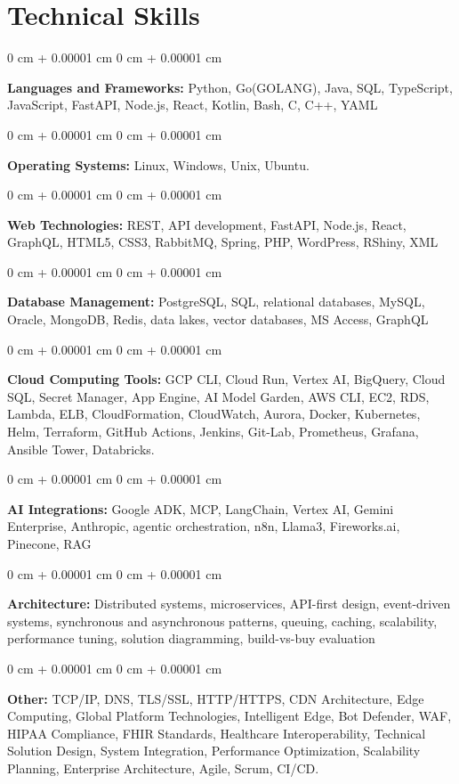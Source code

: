 \documentclass[10pt, letterpaper]{article}
\newenvironment{onecolentry}{
    \begin{adjustwidth}{
        0 cm + 0.00001 cm
    }{
        0 cm + 0.00001 cm
    }
}{
    \end{adjustwidth}
} %
\begin{document}
    \section{Technical Skills}
    \vspace{2 pt }
    \begin{onecolentry}
    \textbf{Languages and Frameworks:} Python, Go(GOLANG), Java, SQL, TypeScript, JavaScript, FastAPI, Node.js, React, Kotlin, Bash, C, C++, YAML
    \end{onecolentry}
    \begin{onecolentry}
        \textbf{Operating Systems:} Linux, Windows, Unix, Ubuntu.
    \end{onecolentry}
    \begin{onecolentry}
         \textbf{Web Technologies:} REST, API development, FastAPI, Node.js, React, GraphQL, HTML5, CSS3, RabbitMQ, Spring, PHP, WordPress, RShiny, XML \end{onecolentry}
    \begin{onecolentry}
        \textbf{Database Management:} PostgreSQL, SQL, relational databases, MySQL, Oracle, MongoDB, Redis, data lakes, vector databases, MS Access, GraphQL \end{onecolentry}
    \begin{onecolentry}
        \textbf{Cloud Computing Tools:}
GCP CLI, Cloud Run, Vertex AI, BigQuery, Cloud SQL, Secret Manager, App Engine, AI Model Garden, AWS CLI, EC2, RDS, Lambda, ELB, CloudFormation, CloudWatch, Aurora, Docker, Kubernetes, Helm, Terraform, GitHub Actions, Jenkins, Git-Lab, Prometheus, Grafana, Ansible Tower, Databricks.
    \end{onecolentry}
    \begin{onecolentry}
         \textbf{AI Integrations:} Google ADK, MCP, LangChain, Vertex AI, Gemini Enterprise, Anthropic, agentic orchestration, n8n, Llama3, Fireworks.ai, Pinecone, RAG \end{onecolentry}
    \begin{onecolentry}
        \textbf{Architecture:} Distributed systems, microservices, API-first design, event-driven systems, synchronous and asynchronous patterns, queuing, caching, scalability, performance tuning, solution diagramming, build-vs-buy evaluation \end{onecolentry}
        \begin{onecolentry}
     \textbf{Other:} TCP/IP, DNS, TLS/SSL, HTTP/HTTPS, CDN Architecture, Edge Computing, Global Platform Technologies, Intelligent Edge, Bot Defender, WAF, HIPAA Compliance, FHIR Standards, Healthcare Interoperability, Technical Solution Design, System Integration, Performance Optimization, Scalability Planning, Enterprise Architecture, Agile, Scrum, CI/CD.
    \end{onecolentry}
\end{document}

